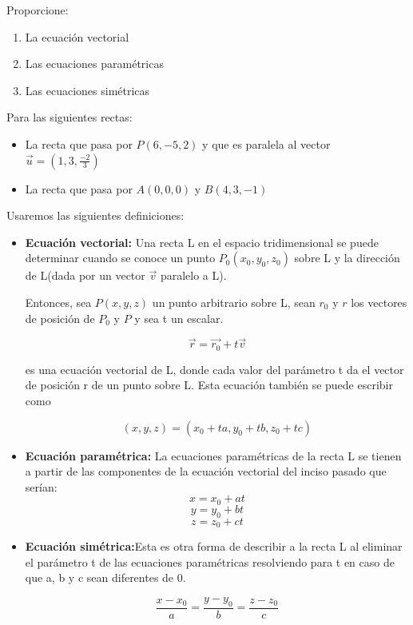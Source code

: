 \documentclass[12pt]{article}
\begin{document}
Proporcione:

\begin{enumerate}

\item La ecuación vectorial

\item Las ecuaciones paramétricas

\item Las ecuaciones simétricas
  
\end{enumerate}

Para las siguientes rectas:

\begin{itemize}
  
\item La recta que pasa por $P(6,-5,2)$ y que es paralela al vector $\vec{u}=(1,3,\frac{-2}{3})$
  
\item La recta que pasa por $A(0,0,0)$ y $B(4,3,-1)$
  
\end{itemize}

Usaremos las siguientes definiciones:

\begin{itemize}
  
\item \textbf{Ecuación vectorial:} Una recta L en el espacio tridimensional se puede determinar cuando se conoce un punto $P_0(x_0, y_0, z_0)$ sobre L y la dirección de L(dada por un vector $\vec{v}$ paralelo a L).
  
  Entonces, sea $P(x, y, z)$ un punto arbitrario sobre L, sean $r_0$ y $r$ los vectores de posición de $P_0$ y $P$ y sea t un escalar.
  
  $$\vec{r} = \vec{r_0} + t\vec{v}$$
  
  es una ecuación vectorial de L, donde cada valor del parámetro t da el vector de posición r de un punto sobre L.
  Esta ecuación también se puede escribir como
  
  $$ (x, y, z) = (x_0+ta, y_0+tb, z_0+tc)$$
  
\item \textbf{Ecuación paramétrica:} La ecuaciones paramétricas de la recta L se tienen a partir de las componentes de la ecuación vectorial del inciso pasado que serían:
  $$x = x_0 + at$$
  $$y = y_0 + bt$$
  $$z = z_0 + ct$$
  
\item \textbf{Ecuación simétrica:}Esta es otra forma de describir a la recta L al eliminar el parámetro t de las ecuaciones paramétricas resolviendo para t en caso de que a, b y c sean diferentes de 0.
  
  \[
  \frac{x-x_0}{a} = \frac{y-y_0}{b} = \frac{z-z_0}{c}
  \]
  
\end{itemize}
\end{document}
